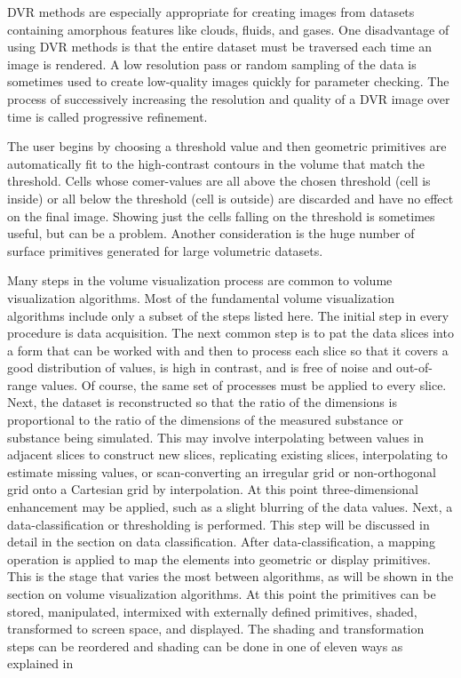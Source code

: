 DVR methods are especially appropriate for creating images from datasets containing amorphous features like clouds, fluids, and gases. One disadvantage of using DVR methods
is that the entire dataset must be traversed each time an image is
rendered. A low resolution pass or random sampling of the data is
sometimes used to create low-quality images quickly for parameter
checking. The process of successively increasing the resolution
and quality of a DVR image over time is called progressive
refinement.

 The user begins by choosing a threshold value
and then geometric primitives are automatically fit to the high-contrast
contours in the volume that match the threshold. Cells
whose comer-values are all above the chosen threshold (cell is
inside) or all below the threshold (cell is outside) are discarded and
have no effect on the final image. Showing just the cells falling on
the threshold is sometimes useful, but can be a problem. Another
consideration is the huge number of surface primitives generated
for large volumetric datasets. 


Many steps in the volume visualization process are common to
volume visualization algorithms.  Most of the fundamental volume
visualization algorithms include only a subset of the steps listed
here.
The initial step in every procedure is data acquisition. The next
common step is to pat the data slices into a form that can be worked
with and then to process each slice so that it covers a good
distribution of values, is high in contrast, and is free of noise and
out-of-range values. Of course, the same set of processes must be
applied to every slice.
Next, the dataset is reconstructed so that the ratio of the
dimensions is proportional to the ratio of the dimensions of the
measured substance or substance being simulated. This may
involve interpolating between values in adjacent slices to construct
new slices, replicating existing slices, interpolating to estimate
missing values, or scan-converting an irregular grid or non-orthogonal
grid onto a Cartesian grid by interpolation. At this point
three-dimensional enhancement may be applied, such as a slight
blurring of the data values. Next, a data-classification or
thresholding is performed. This step will be discussed in detail in
the section on data classification.
After data-classification, a mapping operation is applied to map
the elements into geometric or display primitives. This is the stage
that varies the most between algorithms, as will be shown in the
section on volume visualization algorithms. At this point the
primitives can be stored, manipulated, intermixed with externally
defined primitives, shaded, transformed to screen space, and
displayed. The shading and transformation steps can be reordered
and shading can be done in one of eleven ways as explained in 


